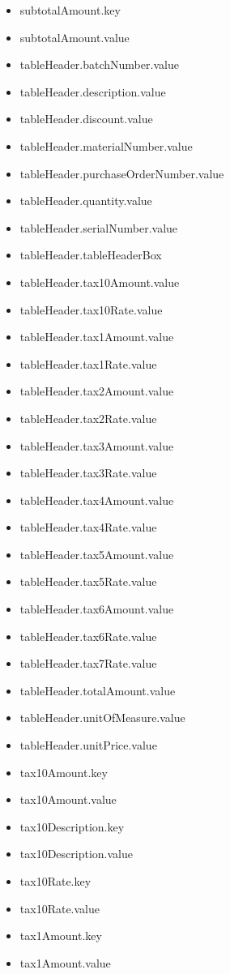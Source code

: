 \begin{multicols}{2}
\begin{itemize}
\item[] subtotalAmount.key
\item[] subtotalAmount.value
\item[] tableHeader.batchNumber.value
\item[] tableHeader.description.value
\item[] tableHeader.discount.value
\item[] tableHeader.materialNumber.value
\item[] tableHeader.purchaseOrderNumber.value
\item[] tableHeader.quantity.value
\item[] tableHeader.serialNumber.value
\item[] tableHeader.tableHeaderBox
\item[] tableHeader.tax10Amount.value
\item[] tableHeader.tax10Rate.value
\item[] tableHeader.tax1Amount.value
\item[] tableHeader.tax1Rate.value
\item[] tableHeader.tax2Amount.value
\item[] tableHeader.tax2Rate.value
\item[] tableHeader.tax3Amount.value
\item[] tableHeader.tax3Rate.value
\item[] tableHeader.tax4Amount.value
\item[] tableHeader.tax4Rate.value
\item[] tableHeader.tax5Amount.value
\item[] tableHeader.tax5Rate.value
\item[] tableHeader.tax6Amount.value
\item[] tableHeader.tax6Rate.value
\item[] tableHeader.tax7Rate.value
\item[] tableHeader.totalAmount.value
\item[] tableHeader.unitOfMeasure.value
\item[] tableHeader.unitPrice.value
\item[] tax10Amount.key
\item[] tax10Amount.value
\item[] tax10Description.key
\item[] tax10Description.value
\item[] tax10Rate.key
\item[] tax10Rate.value
\item[] tax1Amount.key
\item[] tax1Amount.value

\end{itemize}
\end{multicols}
